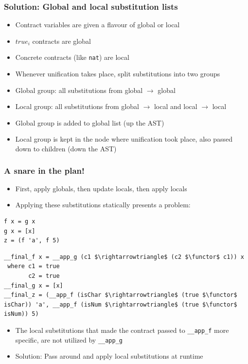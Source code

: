 \documentclass[]{beamer}
\makeatletter
\newcommand{\functor}{<\!\!\!@\!\!\!>}
\makeatother
\begin{document}
\begin{frame}[fragile]
\frametitle{Solution: Global and local substitution lists}

\begin{itemize}
	\item Contract variables are given a flavour of global or local
	\item $true_i$ contracts are global
	\item Concrete contracts (like \texttt{nat}) are local
	\item Whenever unification takes place, split substitutions into two groups
	\item Global group: all substitutions from global $\rightarrow$ global
	\item Local group: all substitutions from global $\rightarrow$ local and local $\rightarrow$ local
	\item Global group is added to global list (up the AST)
	\item Local group is kept in the node where unification took place, also passed down to children (down the AST)
\end{itemize}

\end{frame}

\begin{frame}[fragile]
\frametitle{A snare in the plan!}

\begin{itemize}
	\item First, apply globals, then update locals, then apply locals
	\item Applying these substitutions statically presents a problem:
\end{itemize}

\begin{lstlisting}
f x = g x
g x = [x]
z = (f 'a', f 5)
\end{lstlisting}

\begin{lstlisting}[mathescape]
__final_f x = __app_g (c1 $\rightarrowtriangle$ (c2 $\functor$ c1)) x
 where c1 = true
       c2 = true
__final_g x = [x]
__final_z = (__app_f (isChar $\rightarrowtriangle$ (true $\functor$ isChar)) 'a', __app_f (isNum $\rightarrowtriangle$ (true $\functor$ isNum)) 5)
\end{lstlisting}

\begin{itemize}
	\item The local substitutions that made the contract passed to \texttt{\_\_app\_f} more specific, are not utilized by \texttt{\_\_app\_g}
	\item Solution: Pass around and apply local substitutions at runtime
\end{itemize}

\end{frame}
\end{document}
